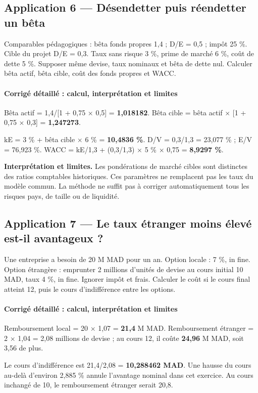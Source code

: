 \documentclass[12pt,a4paper]{article}
\begin{document}
\subsection*{Application 6 --- Désendetter puis réendetter un bêta}
Comparables pédagogiques : bêta fonds propres 1,4 ; D/E = 0,5 ; impôt 25 \%. Cible du projet D/E = 0,3. Taux sans risque 3 \%, prime de marché 6 \%, coût de dette 5 \%. Supposer même devise, taux nominaux et bêta de dette nul. Calculer bêta actif, bêta cible, coût des fonds propres et WACC.


\paragraph{Corrigé détaillé : calcul, interprétation et limites}
Bêta actif = 1,4/[1 + 0,75 $\times$ 0,5] = \textbf{1,018182}. Bêta cible = bêta actif $\times$ [1 + 0,75 $\times$ 0,3] = \textbf{1,247273}.

kE = 3 \% + bêta cible $\times$ 6 \% = \textbf{10,4836 \%}. D/V = 0,3/1,3 = 23,077 \% ; E/V = 76,923 \%. WACC = kE/1,3 + (0,3/1,3) $\times$ 5 \% $\times$ 0,75 = \textbf{8,9297 \%}.

\textbf{Interprétation et limites.} Les pondérations de marché cibles sont distinctes des ratios comptables historiques. Ces paramètres ne remplacent pas les taux du modèle commun. La méthode ne suffit pas à corriger automatiquement tous les risques pays, de taille ou de liquidité.


\subsection*{Application 7 --- Le taux étranger moins élevé est-il avantageux ?}
Une entreprise a besoin de 20 M MAD pour un an. Option locale : 7 \%, in fine. Option étrangère : emprunter 2 millions d’unités de devise au cours initial 10 MAD, taux 4 \%, in fine. Ignorer impôt et frais. Calculer le coût si le cours final atteint 12, puis le cours d’indifférence entre les options.


\paragraph{Corrigé détaillé : calcul, interprétation et limites}
Remboursement local = 20 $\times$ 1,07 = \textbf{21,4} M MAD. Remboursement étranger = 2 $\times$ 1,04 = 2,08 millions de devise ; au cours 12, il coûte \textbf{24,96} M MAD, soit 3,56 de plus.

Le cours d’indifférence est 21,4/2,08 = \textbf{10,288462 MAD}. Une hausse du cours au-delà d’environ 2,885 \% annule l’avantage nominal dans cet exercice. Au cours inchangé de 10, le remboursement étranger serait 20,8.
\end{document}
